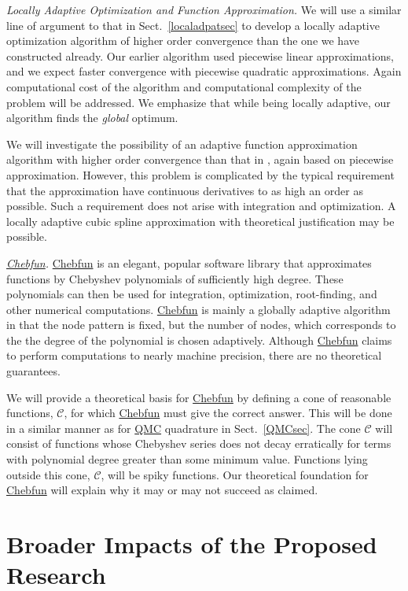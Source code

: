 \documentclass[11pt]{NSFamsart}
\newcommand{\QMC}{\hyperlink{QMClink}{QMC}\xspace}
\newcommand{\Chebfun}{\hyperlink{Chebfunlink}{Chebfun}\xspace}
\newcommand{\cc}{\mathcal{C}}
\begin{document}
\emph{Locally Adaptive Optimization and Function Approximation.}
We will use a similar line of argument to that in Sect.\ 
\ref{localadpatsec} to develop a locally adaptive 
optimization algorithm of higher order convergence than the one we have constructed already.  Our 
earlier 
algorithm used piecewise linear approximations, and we expect faster convergence with piecewise 
quadratic approximations.  Again computational cost of the algorithm and computational complexity 
of the problem will be addressed.  We emphasize that while being locally adaptive, our algorithm 
finds the 
\emph{global} optimum.

We will investigate the possibility of an adaptive function approximation algorithm with higher order 
convergence than that  in 
\cite{ChoEtal17a}, again based on piecewise approximation.  However, this problem is complicated 
by the typical requirement that the 
approximation have continuous derivatives to as high an order as possible.  Such a requirement does 
not arise with integration and 
optimization.  A locally adaptive cubic spline approximation with theoretical justification may be 
possible.

\emph{\Chebfun.}
\Chebfun \cite{TrefEtal17a} is an elegant, popular software library that approximates functions by 
Chebyshev polynomials of 
sufficiently high degree.  These polynomials can then be used for integration, optimization, 
root-finding, and other numerical computations.  \Chebfun is mainly a globally adaptive algorithm in 
that the node pattern is fixed, but the number of nodes, which corresponds to 
the the degree of the polynomial is chosen adaptively.  Although \Chebfun claims to perform 
computations 
to nearly machine precision, there are no theoretical guarantees.  

We will provide a theoretical basis for \Chebfun by defining a cone of reasonable functions, 
$\cc$, for which \Chebfun must give the correct answer.  This will be done in a similar manner as for 
\QMC quadrature in Sect.\ \ref{QMCsec}.  The cone $\cc$ will consist of functions 
whose Chebyshev series does not decay erratically for terms with polynomial degree greater than 
some minimum value.  Functions lying outside this cone, $\cc$, will be spiky functions.   Our 
theoretical foundation for \Chebfun will explain why it may or may not succeed as claimed.

\section{Broader Impacts of the Proposed Research}\label{SectBroad}
\end{document}

